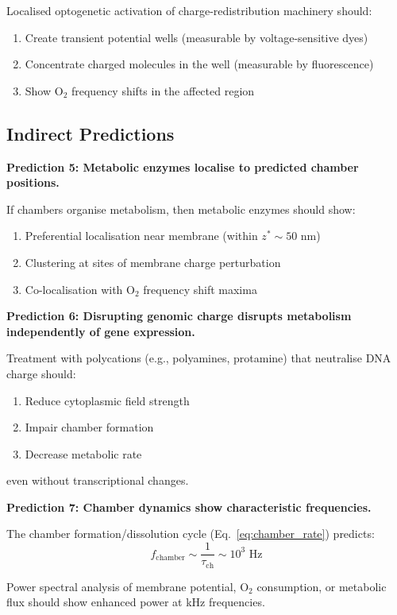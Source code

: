 \documentclass[twocolumn,10pt,aps,prd,superscriptaddress,floatfix,nofootinbib]{revtex4-2}
\theoremstyle{remark}
\newcommand{\taucham}{\tau_{\mathrm{ch}}}
\begin{document}
Localised optogenetic activation of charge-redistribution machinery should:
\begin{enumerate}
\item Create transient potential wells (measurable by voltage-sensitive dyes)
\item Concentrate charged molecules in the well (measurable by fluorescence)
\item Show O$_2$ frequency shifts in the affected region
\end{enumerate}

\subsection{Indirect Predictions}

\textbf{Prediction 5: Metabolic enzymes localise to predicted chamber positions.}

If chambers organise metabolism, then metabolic enzymes should show:
\begin{enumerate}
\item Preferential localisation near membrane (within $z^* \sim 50$ nm)
\item Clustering at sites of membrane charge perturbation
\item Co-localisation with O$_2$ frequency shift maxima
\end{enumerate}

\textbf{Prediction 6: Disrupting genomic charge disrupts metabolism independently of gene expression.}

Treatment with polycations (e.g., polyamines, protamine) that neutralise DNA charge should:
\begin{enumerate}
\item Reduce cytoplasmic field strength
\item Impair chamber formation
\item Decrease metabolic rate
\end{enumerate}
even without transcriptional changes.

\textbf{Prediction 7: Chamber dynamics show characteristic frequencies.}

The chamber formation/dissolution cycle (Eq.~\eqref{eq:chamber_rate}) predicts:
\begin{equation}
f_{\mathrm{chamber}} \sim \frac{1}{\taucham} \sim 10^3 \text{ Hz}
\end{equation}

Power spectral analysis of membrane potential, O$_2$ consumption, or metabolic flux should show enhanced power at kHz frequencies.
\end{document}
